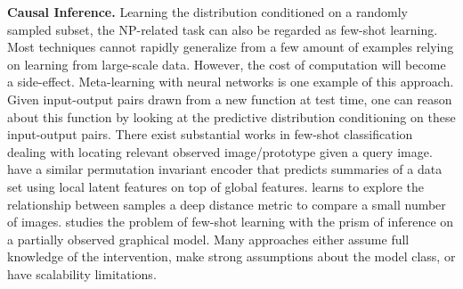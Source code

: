 \documentclass[sigconf]{acmart} %
\begin{document}
\noindent\textbf{Causal Inference.}
Learning the distribution conditioned on a randomly sampled subset, the NP-related task can also be regarded as few-shot learning. Most techniques cannot rapidly generalize from a few amount of examples relying on learning from large-scale data. However, the cost of computation will become a side-effect.
Meta-learning with neural networks is one example of this approach. Given input-output pairs drawn from a new function at test time, one can reason about this function by looking at the predictive distribution conditioning on these input-output pairs. There exist substantial works in few-shot classification~\cite{kipf2016semi,vinyals2016matching,snell2017prototypical,santoro2016one} dealing with locating relevant observed image/prototype given a query image. 
\cite{edwards2016towards,hewitt2018variational} have a similar permutation invariant encoder that predicts summaries of a data set using local latent features on top of global features. \cite{sung2018learning} learns to explore the relationship between samples a deep distance metric to compare a small number of images. \cite{garcia2017few}  studies the problem of few-shot learning with the prism of inference on a partially observed graphical model. 
Many approaches either assume full knowledge of the intervention, make strong assumptions about the model class, or have scalability limitations.
\end{document}
